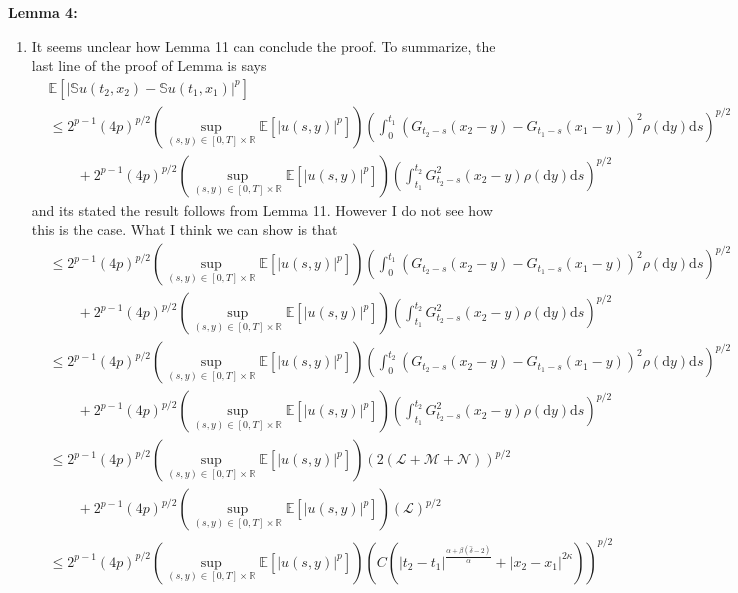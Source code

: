 \documentclass[a4paper,11pt]{article}
\numberwithin{equation}{section}
\numberwithin{equation}{section}
\theoremstyle{plain}
\theoremstyle{definition}
\newcommand{\ud}{\ensuremath{\mathrm{d} }}
\newcommand{\R}{\mathbb{R}}
\begin{document}
\textbf{Lemma 4:}
\begin{enumerate}
\item It seems unclear how Lemma 11 can conclude the proof. To summarize, the last line of the proof of Lemma is says 	
	\begin{align*}
		&\mathbb{E}\left[ |\mathbb{S}u(t_2,x_2) - \mathbb{S}u(t_1,x_1)|^p \right]
		\\& \le 2^{p-1}(4p)^{p/2} \left(\sup_{(s,y)\in[0,T]\times \R} \mathbb{E}\left[|u(s,y)|^p\right]\right) \left( \int_0^{t_1} (G_{t_2-s}(x_2-y)-G_{t_1-s}(x_1-y))^2 \rho(\ud y) \ud s \right)^{p/2}
		\\& \quad \quad+ 2^{p-1}(4p)^{p/2} \left(\sup_{(s,y)\in[0,T]\times \R} \mathbb{E}\left[|u(s,y)|^p\right]\right)\left( \int_{t_1}^{t_2} G^2_{t_2-s}(x_2-y) \rho(\ud y) \ud s \right)^{p/2}
	\end{align*}
and its stated the result follows from Lemma 11. However I do not see how this is the case. What I think we can show is that 
	\begin{align*}
		& \le 2^{p-1}(4p)^{p/2} \left(\sup_{(s,y)\in[0,T]\times \R} \mathbb{E}\left[|u(s,y)|^p\right]\right) \left( \int_0^{t_1} (G_{t_2-s}(x_2-y)-G_{t_1-s}(x_1-y))^2 \rho(\ud y) \ud s \right)^{p/2}
		\\& \quad \quad+ 2^{p-1}(4p)^{p/2} \left(\sup_{(s,y)\in[0,T]\times \R} \mathbb{E}\left[|u(s,y)|^p\right]\right)\left( \int_{t_1}^{t_2} G^2_{t_2-s}(x_2-y) \rho(\ud y) \ud s \right)^{p/2}
		\\& \le 2^{p-1}(4p)^{p/2} \left(\sup_{(s,y)\in[0,T]\times \R} \mathbb{E}\left[|u(s,y)|^p\right]\right) \left( \int_0^{t_2} (G_{t_2-s}(x_2-y)-G_{t_1-s}(x_1-y))^2 \rho(\ud y) \ud s \right)^{p/2}
		\\& \quad \quad+ 2^{p-1}(4p)^{p/2} \left(\sup_{(s,y)\in[0,T]\times \R} \mathbb{E}\left[|u(s,y)|^p\right]\right)\left( \int_{t_1}^{t_2} G^2_{t_2-s}(x_2-y) \rho(\ud y) \ud s \right)^{p/2}
		\\& \le 2^{p-1}(4p)^{p/2} \left(\sup_{(s,y)\in[0,T]\times \R} \mathbb{E}\left[|u(s,y)|^p\right]\right) \left( 2(\mathcal{L}+\mathcal{M} + \mathcal{N}) \right)^{p/2}
		\\& \quad \quad+ 2^{p-1}(4p)^{p/2} \left(\sup_{(s,y)\in[0,T]\times \R} \mathbb{E}\left[|u(s,y)|^p\right]\right)\left( \mathcal{L} \right)^{p/2}
		\\& \le 2^{p-1}(4p)^{p/2} \left(\sup_{(s,y)\in[0,T]\times \R} \mathbb{E}\left[|u(s,y)|^p\right]\right) \left( C\left(|t_2-t_1|^{\frac{\alpha + \beta(\hat{\delta} -2)}{\alpha}} + |x_2-x_1|^{2\kappa} \right)\right)^{p/2}

\end{align*}
\end{enumerate}
\end{document}
